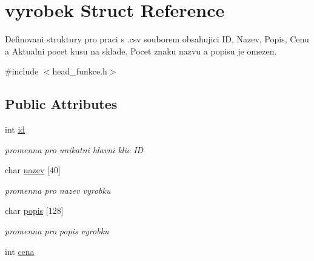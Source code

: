 \hypertarget{structvyrobek}{\section{vyrobek Struct Reference}
\label{structvyrobek}
}


Definovani struktury pro praci s .csv souborem obsahujici I\-D, Nazev, Popis, Cenu a Aktualni pocet kusu na sklade. Pocet znaku nazvu a popisu je omezen.  




{\ttfamily \#include $<$head\-\_\-funkce.\-h$>$}

\subsection*{Public Attributes}
\begin{DoxyCompactItemize}
\item 
\hypertarget{structvyrobek_a34aac399c9f6ad9ad84da8015ad3c83b}{int \hyperlink{structvyrobek_a34aac399c9f6ad9ad84da8015ad3c83b}{id}}\label{structvyrobek_a34aac399c9f6ad9ad84da8015ad3c83b}

\begin{DoxyCompactList}\small\item\em promenna pro unikatni hlavni klic I\-D \end{DoxyCompactList}\item 
\hypertarget{structvyrobek_ab9fe7e2112d2ae49790bcdb46c374d5c}{char \hyperlink{structvyrobek_ab9fe7e2112d2ae49790bcdb46c374d5c}{nazev} \mbox{[}40\mbox{]}}\label{structvyrobek_ab9fe7e2112d2ae49790bcdb46c374d5c}

\begin{DoxyCompactList}\small\item\em promenna pro nazev vyrobku \end{DoxyCompactList}\item 
\hypertarget{structvyrobek_a329a3518d688a7ba646ab48fbe9c09cc}{char \hyperlink{structvyrobek_a329a3518d688a7ba646ab48fbe9c09cc}{popis} \mbox{[}128\mbox{]}}\label{structvyrobek_a329a3518d688a7ba646ab48fbe9c09cc}

\begin{DoxyCompactList}\small\item\em promenna pro popis vyrobku \end{DoxyCompactList}\item 
\hypertarget{structvyrobek_a2d611e029d145e13056cd368843a84d3}{int \hyperlink{structvyrobek_a2d611e029d145e13056cd368843a84d3}{cena}}\label{structvyrobek_a2d611e029d145e13056cd368843a84d3}


\end{DoxyCompactItemize}
